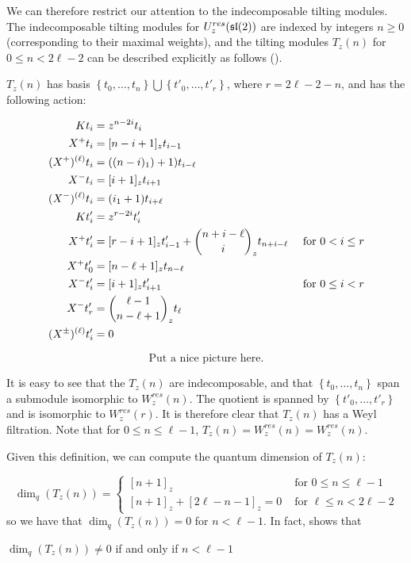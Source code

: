 We can therefore restrict our attention to the indecomposable tilting modules.
The indecomposable tilting modules for $U_z^{res}(\mathfrak{sl}(2))$ are indexed by integers $n
\geq 0$ (corresponding to their maximal weights), and the tilting modules
$T_z(n)$ for $0 \leq n < 2\ell - 2$ can be described explicitly as follows
(\cite{CP}). 

$T_z(n)$ has basis $\left\{ t_0, \ldots, t_n \right\} \bigcup \left\{ t'_0,
    \ldots, t'_{r} \right\}$, where $r = 2\ell - 2 - n$, and has the following
    action:

\begin{align*}
    Kt_i &= z^{n-2i} t_i \\
    X^+ t_i &= [n-i+1]_z t_{i-1} \\
    (X^+)^{(\ell)} t_i &= ( (n-i)_1) + 1) t_{i-\ell} \\
    X^-t_i &= [i+1]_z t_{i+1} \\
    (X^-)^{(\ell)} t_i &= ( i_1 + 1) t_{i+\ell} \\
    Kt'_i &= z^{r-2i} t'_i \\
    X^+ t'_i &= [r-i+1]_z t'_{i-1}  + \dbinom{n + i - \ell}{i}_z t_{n+i-\ell} &\text{ for $0 < i \leq r$}\\
    X^+ t'_0 &= [n - \ell + 1]_z t_{n-\ell} \\
    X^-t'_i &= [i+1]_z t'_{i+1} &\text{ for $0 \leq i < r$}\\
    X^- t'_r &= \dbinom{\ell - 1}{n - \ell + 1}_z t_\ell \\
    (X^\pm)^{(\ell)} t'_i  &= 0
\end{align*}

\begin{equation}
\text{Put a nice picture here.}
\end{equation}

It is easy to see that the $T_z(n)$ are indecomposable, and that $\left\{ t_0,
\ldots, t_n \right\}$ span a submodule isomorphic to $W_z^{res}(n)$. The
quotient is spanned by $\left\{ t'_0, \ldots, t'_r \right\}$ and is
isomorphic to $W_z^{res}(r)$. It is therefore clear that $T_z(n)$ has a Weyl
filtration. Note that for $0 \leq n \leq \ell -1$, $T_z(n) = W_z^{res}(n) = W_{z}^{res}(n)$.

Given this definition, we can compute the quantum dimension of $T_z(n)$: 

\begin{equation}
    \dim_q(T_z(n)) = \begin{cases} [n+1]_z &\text{ for $0 \leq n \leq \ell-1$} \\
                                   [n+1]_z + [2\ell-n-1]_z = 0 &\text{ for $\ell \leq n < 2\ell - 2$}
                     \end{cases}
\end{equation}
so we have that $\dim_q(T_z(n)) = 0$ for $n < \ell-1$. In fact, \cite{Andersen1992} shows that 
\begin{prop}
$\dim_q(T_z(n)) \neq 0$ if and only if $n < \ell - 1$
\end{prop}

